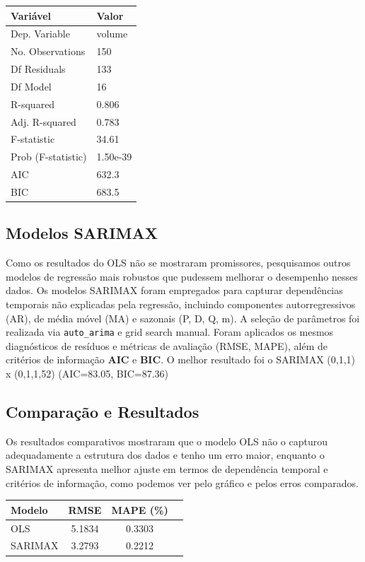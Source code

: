 \documentclass{article}
\begin{document}
\begin{table}[h!]
\centering
\begin{tabular}{ll}
\hline
\textbf{Variável} & \textbf{Valor} \\
\hline
Dep. Variable       & volume \\
No. Observations    & 150 \\
Df Residuals        & 133 \\
Df Model            & 16 \\
R-squared           & 0.806 \\
Adj. R-squared      & 0.783 \\
F-statistic         & 34.61 \\
Prob (F-statistic)  & 1.50e-39 \\
AIC                 & 632.3 \\
BIC                 & 683.5 \\
\hline
\end{tabular}
\end{table}

\subsection*{Modelos SARIMAX}
Como os resultados do OLS não se mostraram promissores, pesquisamos outros modelos de regressão mais robustos que pudessem melhorar o desempenho nesses dados. Os modelos SARIMAX foram empregados para capturar dependências temporais não explicadas pela regressão, incluindo componentes autorregressivos (AR), de média móvel (MA) e sazonais (P, D, Q, m).  
A seleção de parâmetros foi realizada via \texttt{auto\_arima} e grid search manual. Foram aplicados os mesmos diagnósticos de resíduos e métricas de avaliação (RMSE, MAPE), além de critérios de informação \textbf{AIC} e \textbf{BIC}. O melhor resultado foi
o SARIMAX (0,1,1) x (0,1,1,52) (AIC=83.05, BIC=87.36)

\subsection*{Comparação e Resultados}
Os resultados comparativos mostraram que o modelo OLS não o  capturou adequadamente a estrutura dos dados e tenho um erro maior, enquanto o SARIMAX apresenta melhor ajuste em termos de dependência temporal e critérios de informação, como podemos ver pelo gráfico e pelos erros comparados.  

\begin{table}[h]
    \centering
    \begin{tabular}{|l|c|c|c|}
        \hline
        \textbf{Modelo}  & \textbf{RMSE} & \textbf{MAPE (\%)} \\
        \hline
        OLS & 5.1834 & 0.3303 \\
        SARIMAX  & 3.2793 & 0.2212 \\
        \hline
    \end{tabular}
    \label{tab:baseline_results}
\end{table}
\end{document}
